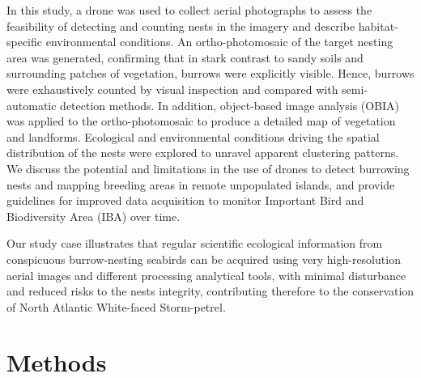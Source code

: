 \documentclass[12pt]{article}
\begin{document}
In this study, a drone was used to collect aerial photographs to assess the feasibility of detecting and counting nests in the imagery and describe habitat-specific environmental conditions. An ortho-photomosaic of the target nesting area was generated, confirming that in stark contrast to sandy soils and surrounding patches of vegetation, burrows were explicitly visible. Hence, burrows were exhaustively counted by visual inspection and compared with semi-automatic detection methods. In addition, object-based image analysis (OBIA) was applied to the ortho-photomosaic to produce a detailed map of vegetation and landforms. Ecological and environmental conditions driving the spatial distribution of the nests were explored to unravel apparent clustering patterns. We discuss the potential and limitations in the use of drones to detect burrowing nests and mapping breeding areas in remote unpopulated islands, and provide guidelines for improved data acquisition to monitor Important Bird and Biodiversity Area (IBA) over time. 

Our study case illustrates that regular scientific ecological information from conspicuous burrow-nesting seabirds can be acquired using very high-resolution aerial images and different processing analytical tools, with minimal disturbance and reduced risks to the nests integrity, contributing therefore to the conservation of North Atlantic White-faced Storm-petrel.

\section{Methods}



\end{document}
